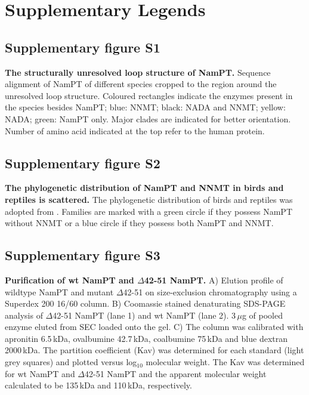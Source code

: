 
\section*{Supplementary Legends}

\subsection*{Supplementary figure S1}

\textbf{The structurally unresolved loop structure of NamPT.} Sequence alignment of NamPT of different species cropped to the region around the unresolved loop structure. Coloured rectangles indicate the enzymes present in the species besides NamPT; blue: NNMT; black: NADA and NNMT; yellow: NADA; green: NamPT only. Major clades are indicated for better orientation. Number of amino acid indicated at the top refer to the human protein.


\subsection*{Supplementary figure S2}

\textbf{The phylogenetic distribution of NamPT and NNMT in birds and reptiles is scattered.} The phylogenetic distribution of birds and reptiles was adopted from \cite{Prum2015}. Families are marked with a green circle if they possess NamPT without NNMT or a blue circle if they possess both NamPT and NNMT.


\subsection*{Supplementary figure S3}

\textbf{Purification of wt NamPT and $\Delta$42-51 NamPT.} A) Elution profile of wildtype NamPT and mutant $\Delta$42-51 on size-exclusion chromatography using a Superdex 200 16/60 column. B) Coomassie stained denaturating SDS-PAGE analysis of $\Delta$42-51 NamPT (lane 1) and wt NamPT (lane 2). 3\,$\mu$g of pooled enzyme eluted from SEC loaded onto the gel. C) The column was calibrated with apronitin 6.5\,kDa, ovalbumine 42.7\,kDa, coalbumine 75\,kDa and blue dextran 2000\,kDa. The partition coefficient (Kav) was determined for each standard (light grey squares) and plotted versus log$_{10}$ molecular weight. The Kav was determined for wt NamPT and $\Delta$42-51 NamPT and the apparent molecular weight calculated to be 135\,kDa and 110\,kDa, respectively.



